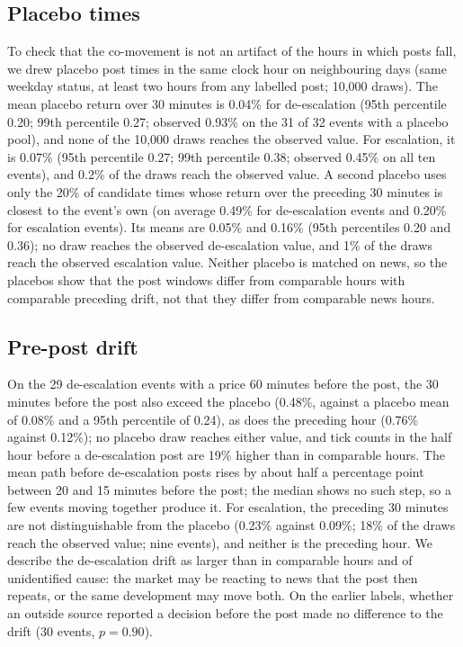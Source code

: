 \documentclass[11pt]{article}
\begin{document}
\subsection{Placebo times}

To check that the co-movement is not an artifact of the hours in which posts fall, we drew placebo post times in the same clock hour on neighbouring days (same weekday status, at least two hours from any labelled post; 10,000 draws). The mean placebo return over 30 minutes is 0.04\% for de-escalation (95th percentile 0.20; 99th percentile 0.27; observed 0.93\% on the 31 of 32 events with a placebo pool), and none of the 10,000 draws reaches the observed value. For escalation, it is 0.07\% (95th percentile 0.27; 99th percentile 0.38; observed 0.45\% on all ten events), and 0.2\% of the draws reach the observed value. A second placebo uses only the 20\% of candidate times whose return over the preceding 30 minutes is closest to the event's own (on average 0.49\% for de-escalation events and 0.20\% for escalation events). Its means are 0.05\% and 0.16\% (95th percentiles 0.20 and 0.36); no draw reaches the observed de-escalation value, and 1\% of the draws reach the observed escalation value. Neither placebo is matched on news, so the placebos show that the post windows differ from comparable hours with comparable preceding drift, not that they differ from comparable news hours.

\subsection{Pre-post drift}

On the 29 de-escalation events with a price 60 minutes before the post, the 30 minutes before the post also exceed the placebo (0.48\%, against a placebo mean of 0.08\% and a 95th percentile of 0.24), as does the preceding hour (0.76\% against 0.12\%); no placebo draw reaches either value, and tick counts in the half hour before a de-escalation post are 19\% higher than in comparable hours. The mean path before de-escalation posts rises by about half a percentage point between 20 and 15 minutes before the post; the median shows no such step, so a few events moving together produce it. For escalation, the preceding 30 minutes are not distinguishable from the placebo (0.23\% against 0.09\%; 18\% of the draws reach the observed value; nine events), and neither is the preceding hour. We describe the de-escalation drift as larger than in comparable hours and of unidentified cause: the market may be reacting to news that the post then repeats, or the same development may move both. On the earlier labels, whether an outside source reported a decision before the post made no difference to the drift (30 events, $p = 0.90$).
\end{document}
